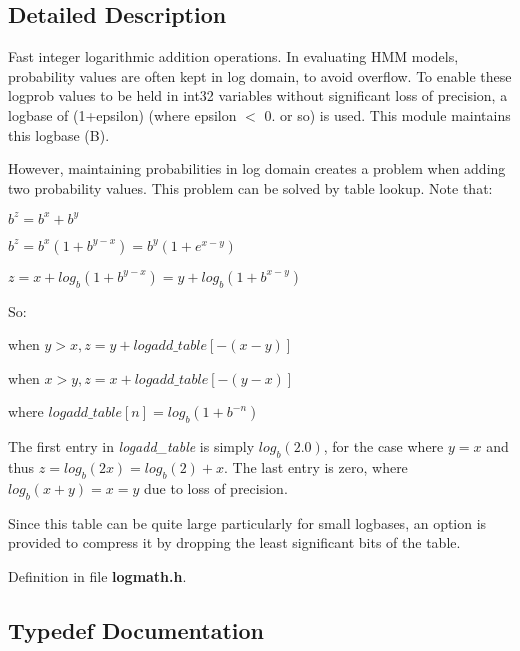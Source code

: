 \subsection{Detailed Description}
Fast integer logarithmic addition operations. In evaluating H\-M\-M models, probability values are often kept in log domain, to avoid overflow. To enable these logprob values to be held in int32 variables without significant loss of precision, a logbase of (1+epsilon) (where epsilon $<$ 0. or so) is used. This module maintains this logbase (B).

However, maintaining probabilities in log domain creates a problem when adding two probability values. This problem can be solved by table lookup. Note that\-:


\begin{DoxyItemize}
\item $ b^z = b^x + b^y $
\item $ b^z = b^x(1 + b^{y-x}) = b^y(1 + e^{x-y}) $
\item $ z = x + log_b(1 + b^{y-x}) = y + log_b(1 + b^{x-y}) $
\end{DoxyItemize}

So\-:


\begin{DoxyItemize}
\item when $ y > x, z = y + logadd\_table[-(x-y)] $
\item when $ x > y, z = x + logadd\_table[-(y-x)] $
\item where $ logadd\_table[n] = log_b(1 + b^{-n}) $
\end{DoxyItemize}

The first entry in {\itshape logadd\-\_\-table} is simply $ log_b(2.0) $, for the case where $ y = x $ and thus $ z = log_b(2x) = log_b(2) + x $. The last entry is zero, where $ log_b(x+y) = x = y $ due to loss of precision.

Since this table can be quite large particularly for small logbases, an option is provided to compress it by dropping the least significant bits of the table. 

Definition in file {\bf logmath.\-h}.



\subsection{Typedef Documentation}
